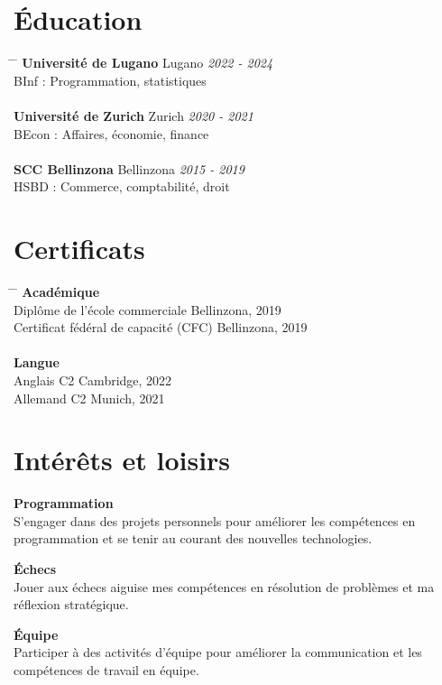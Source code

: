 \documentclass[a4paper,11pt]{article}  %
\begin{document}
\section*{Éducation}
\begin{tabbing}
\hspace{3.5in} \= \hspace{2in} \= \kill
\textbf{Université de Lugano} \> Lugano \> \textit{2022 - 2024} \\
BInf : Programmation, statistiques \> \\
\\
\textbf{Université de Zurich} \> Zurich \> \textit{2020 - 2021} \\
BEcon : Affaires, économie, finance \> \\
\\
\textbf{SCC Bellinzona} \> Bellinzona \> \textit{2015 - 2019} \\
HSBD : Commerce, comptabilité, droit \> \\
\end{tabbing}


\section*{Certificats}
\begin{tabbing}
\hspace{3.5in} \= \hspace{2in} \= \kill
\textbf{Académique} \\
Diplôme de l'école commerciale \> Bellinzona, 2019 \\
Certificat fédéral de capacité (CFC) \> Bellinzona, 2019 \\
\\
\textbf{Langue} \\
Anglais C2 \> Cambridge, 2022 \\
Allemand C2 \> Munich, 2021 \\
\end{tabbing}

\newpage

\section*{Intérêts et loisirs}
\begin{multicols}{3}
\justifying
\textbf{Programmation} \\
S'engager dans des projets personnels
pour améliorer les compétences en programmation et
se tenir au courant des nouvelles technologies.

\columnbreak

\justifying
\textbf{Échecs} \\
Jouer aux échecs aiguise mes
compétences en résolution de problèmes et
ma réflexion stratégique.

\columnbreak

\justifying
\textbf{Équipe} \\
Participer à des activités d'équipe
pour améliorer la communication
et les compétences de travail en équipe.
\end{multicols}
\end{document}
